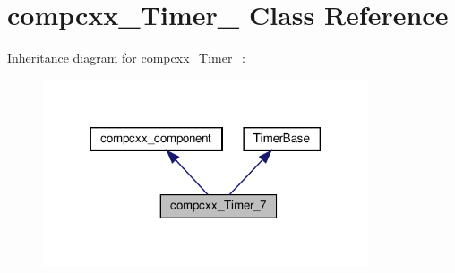 \hypertarget{classcompcxx__Timer__7}{}\section{compcxx\+\_\+\+Timer\+\_ Class Reference}
\label{classcompcxx__Timer__7}


Inheritance diagram for compcxx\+\_\+\+Timer\+\_\+:\nopagebreak
\begin{figure}[H]
\begin{center}
\leavevmode
\includegraphics[width=272pt]{classcompcxx__Timer__7__inherit__graph}
\end{center}
\end{figure}


